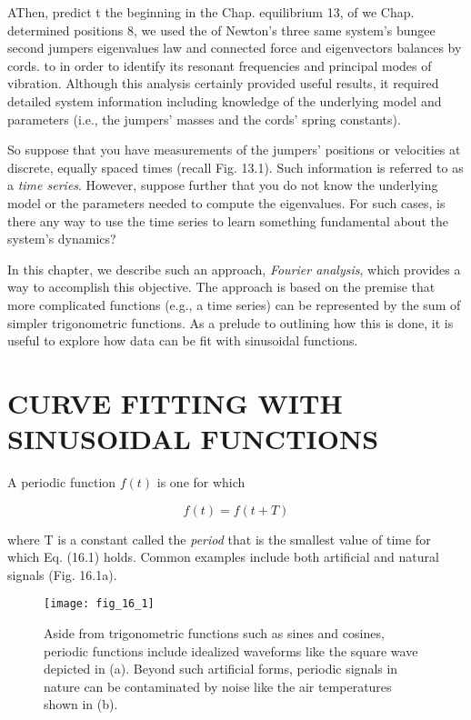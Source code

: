 \documentclass[../main.tex]{subfiles}
\begin{document}

AThen, predict t the beginning in the Chap. equilibrium 13, of we Chap. determined positions 8, we used the of Newton's three same system's bungee second jumpers eigenvalues law and connected force and eigenvectors
balances by cords.
to
in order to identify its resonant frequencies and principal modes of vibration. Although this analysis certainly provided useful results, it required detailed system information including
knowledge of the underlying model and parameters (i.e., the jumpers' masses and the
cords' spring constants).

So suppose that you have measurements of the jumpers' positions or velocities at discrete, equally spaced times (recall Fig. 13.1). Such information is referred to as a \textit{time series}. However, suppose further that you do not know the underlying model or the parameters needed to compute the eigenvalues. For such cases, is there any way to use the time
series to learn something fundamental about the system's dynamics?

In this chapter, we describe such an approach, \textit{Fourier analysis}, which provides a way to accomplish this objective. The approach is based on the premise that more complicated functions (e.g., a time series) can be represented by the sum of simpler trigonometric functions. As a prelude to outlining how this is done, it is useful to explore how data can be fit
with sinusoidal functions.

\label{cha:cha_P_16_1}
\section{CURVE FITTING WITH SINUSOIDAL FUNCTIONS}

\noindent A periodic function $f(t)$ is one for which

\begin{equation}
	\tag{16.1}
	f(t) = f(t + T)
\end{equation}

\noindent where T is a constant called the \textit{period} that is the smallest value of time for which Eq. (16.1) holds. Common examples include both artificial and natural signals (Fig. 16.1a).

\begin{figure}[H]
	\centering
	\texttt{[image: fig\_16\_1]}
	\caption{\textsf{Aside from trigonometric functions such as sines and cosines, periodic functions include
	idealized waveforms like the square wave depicted in (a). Beyond such artificial forms, periodic
	signals in nature can be contaminated by noise like the air temperatures shown in (b).}}
	\label{fig:fig_16_1}
\end{figure}
\end{document}
